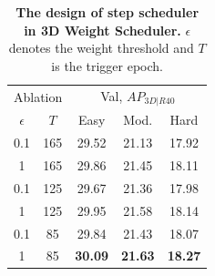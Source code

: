 \begin{table}[h!]
    \centering
    \caption{\textbf{The design of step scheduler in 3D Weight Scheduler.} $\epsilon$ denotes the weight threshold and $T$ is the trigger epoch.}
    \begin{tabular}{cc|ccc}
         \toprule
         \multicolumn{2}{c|}{Ablation} & \multicolumn{3}{c}{Val, $AP_{3D|R40}$} \\
         $\epsilon$ & $T$ & Easy & Mod. & Hard \\ \midrule \midrule
         0.1 & 165 &  29.52 & 21.13 & 17.92 \\
         1 & 165  & 29.86 & 21.45 & 18.11\\
         0.1 & 125 & 29.67 & 21.36 & 17.98 \\
         1 & 125 & 29.95 & 21.58 & 18.14 \\
         0.1 & 85 & 29.84 & 21.43 & 18.07 \\
         1 & 85 &\textbf{30.09} & \textbf{21.63} & \textbf{18.27} \\
         \bottomrule
    \end{tabular}
    \label{tab:3d_weight_scheduler_step}
\end{table}